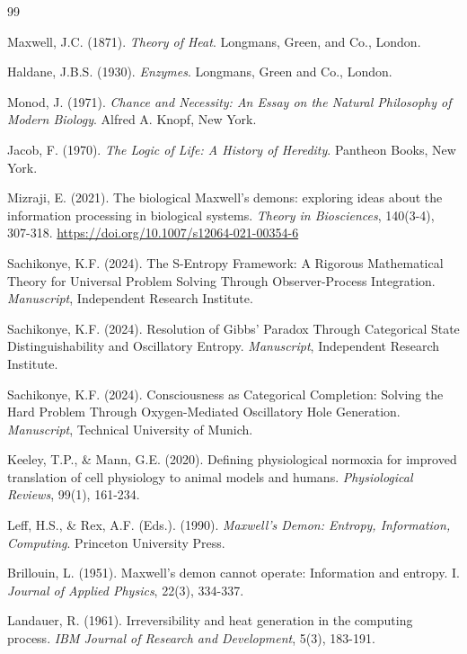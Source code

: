 \documentclass[12pt,a4paper]{article}
\begin{document}

\begin{thebibliography}{99}

Maxwell, J.C. (1871). \textit{Theory of Heat}. Longmans, Green, and Co., London.

Haldane, J.B.S. (1930). \textit{Enzymes}. Longmans, Green and Co., London.

Monod, J. (1971). \textit{Chance and Necessity: An Essay on the Natural Philosophy of Modern Biology}. Alfred A. Knopf, New York.

Jacob, F. (1970). \textit{The Logic of Life: A History of Heredity}. Pantheon Books, New York.

Mizraji, E. (2021). The biological Maxwell's demons: exploring ideas about the information processing in biological systems. \textit{Theory in Biosciences}, 140(3-4), 307-318. \url{https://doi.org/10.1007/s12064-021-00354-6}

Sachikonye, K.F. (2024). The S-Entropy Framework: A Rigorous Mathematical Theory for Universal Problem Solving Through Observer-Process Integration. \textit{Manuscript}, Independent Research Institute.

Sachikonye, K.F. (2024). Resolution of Gibbs' Paradox Through Categorical State Distinguishability and Oscillatory Entropy. \textit{Manuscript}, Independent Research Institute.

Sachikonye, K.F. (2024). Consciousness as Categorical Completion: Solving the Hard Problem Through Oxygen-Mediated Oscillatory Hole Generation. \textit{Manuscript}, Technical University of Munich.

Keeley, T.P., \& Mann, G.E. (2020). Defining physiological normoxia for improved translation of cell physiology to animal models and humans. \textit{Physiological Reviews}, 99(1), 161-234.

Leff, H.S., \& Rex, A.F. (Eds.). (1990). \textit{Maxwell's Demon: Entropy, Information, Computing}. Princeton University Press.

Brillouin, L. (1951). Maxwell's demon cannot operate: Information and entropy. I. \textit{Journal of Applied Physics}, 22(3), 334-337.

Landauer, R. (1961). Irreversibility and heat generation in the computing process. \textit{IBM Journal of Research and Development}, 5(3), 183-191.


\end{thebibliography}
\end{document}
